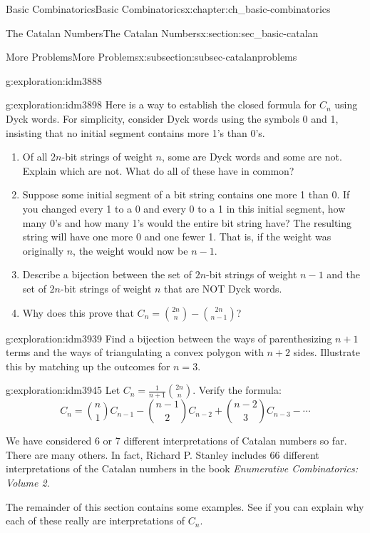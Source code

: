 \documentclass[oneside,10pt,]{book}
\numberwithin{equation}{chapter}
\begin{document}
\begin{chapterptx}{Basic Combinatorics}{}{Basic Combinatorics}{}{}{x:chapter:ch_basic-combinatorics}
\begin{sectionptx}{The Catalan Numbers}{}{The Catalan Numbers}{}{}{x:section:sec_basic-catalan}
\begin{subsectionptx}{More Problems}{}{More Problems}{}{}{x:subsection:subsec-catalanproblems}
\begin{exploration}{}{g:exploration:idm3888}
\end{exploration}
\begin{exploration}{}{g:exploration:idm3898}%
Here is a way to establish the closed formula for \(C_n\) using Dyck words.  For simplicity, consider Dyck words using the symbols 0 and 1, insisting that no initial segment contains more 1's than 0's.%
\begin{enumerate}[font=\bfseries,label=(\alph*),ref=\alph*]
\item{}Of all \(2n\)-bit strings of weight \(n\), some are Dyck words and some are not.  Explain which are not.  What do all of these have in common?%
\item{}Suppose some initial segment of a bit string contains one more 1 than 0.  If you changed every 1 to a 0 and every 0 to a 1 in this initial segment, how many 0's and how many 1's would the entire bit string have?%
The resulting string will have one more 0 and one fewer 1.  That is, if the weight was originally \(n\), the weight would now be \(n-1\).%
\item{}Describe a bijection between the set of \(2n\)-bit strings of weight \(n-1\) and the set of \(2n\)-bit strings of weight \(n\) that are NOT Dyck words.%
\item{}Why does this prove that \(C_n = \binom{2n}{n} - \binom{2n}{n-1}\)?%
\end{enumerate}
\end{exploration}
\begin{exploration}{}{g:exploration:idm3939}%
Find a bijection between the ways of parenthesizing \(n+1\) terms and the ways of triangulating a convex polygon with \(n+2\) sides.  Illustrate this by matching up the outcomes for \(n = 3\).%
\end{exploration}
\begin{exploration}{}{g:exploration:idm3945}%
Let \(C_{n} = \frac{1}{n + 1}\binom{2n}{n}\). Verify the formula:%
\begin{equation*}
C_{n} = \binom{n}{1} C_{n - 1} - \binom{n - 1}{2} C_{n - 2} + \binom{n - 2}{3} C_{n - 3} - \cdots
\end{equation*}
%
\end{exploration}
We have considered 6 or 7 different interpretations of Catalan numbers so far.  There are many others.  In fact, Richard P. Stanley includes 66 different interpretations of the Catalan numbers in the book \emph{Enumerative Combinatorics: Volume 2}.%
\par
The remainder of this section contains some examples.  See if you can explain why each of these really are interpretations of \(C_n\).%

\end{subsectionptx}
\end{sectionptx}
\end{chapterptx}
\end{document}
